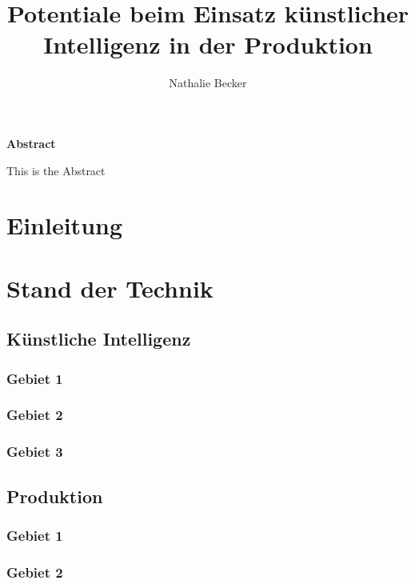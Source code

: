 \documentclass[a4paper,12pt, german]{report}
\begin{document}
\title{Potentiale beim Einsatz künstlicher Intelligenz in der Produktion}
\author{Nathalie Becker}


\begin{titlepage}
\maketitle
\end{titlepage}


\begin{center}
\textbf{Abstract}
\end{center}
This is the Abstract


\tableofcontents
\printacronyms

\chapter{Einleitung}



\chapter{Stand der Technik}

\section{Künstliche Intelligenz}

\subsection{Gebiet 1}

\subsection{Gebiet 2}

\subsection{Gebiet 3}


\section{Produktion}

\subsection{Gebiet 1}

\subsection{Gebiet 2}
\end{document}
